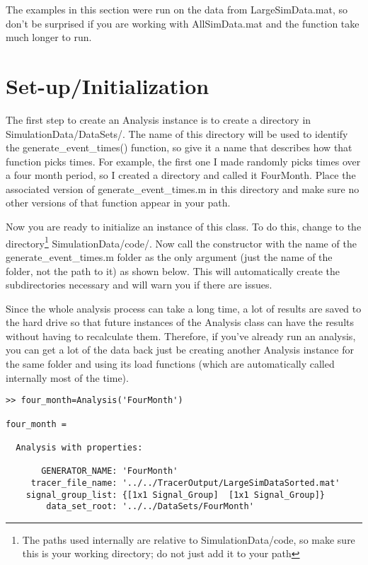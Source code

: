 \documentclass[12pt]{report}
\begin{document}
The examples in this section were run on the data from LargeSimData.mat, so don't be surprised if you are working with AllSimData.mat and the function take much longer to run.

\section{Set-up/Initialization}
The first step to create an Analysis instance is to create a directory in SimulationData/DataSets/.  The name of this directory will be used to identify the generate\_event\_times() function, so give it a name that describes how that function picks times.  For example, the first one I made randomly picks times over a four month period, so I created a directory and called it FourMonth.  Place the associated version of generate\_event\_times.m in this directory and make sure no other versions of that function appear in your path.

Now you are ready to initialize an instance of this class.  To do this, change to the directory\footnote{The paths used internally are relative to SimulationData/code, so make sure this is your working directory; do not just add it to your path} SimulationData/code/.  Now call the constructor with the name of the generate\_event\_times.m folder as the only argument (just the name of the folder, not the path to it) as shown below.  This will automatically create the subdirectories necessary and will warn you if there are issues.

Since the whole analysis process can take a long time, a lot of results are saved to the hard drive so that future instances of the Analysis class can have the results without having to recalculate them.  Therefore, if you've already run an analysis, you can get a lot of the data back just be creating another Analysis instance for the same folder and using its load functions (which are automatically called internally most of the time).

\begin{verbatim}
>> four_month=Analysis('FourMonth')

four_month = 

  Analysis with properties:

       GENERATOR_NAME: 'FourMonth'
     tracer_file_name: '../../TracerOutput/LargeSimDataSorted.mat'
    signal_group_list: {[1x1 Signal_Group]  [1x1 Signal_Group]}
        data_set_root: '../../DataSets/FourMonth'
\end{verbatim}
\end{document}
